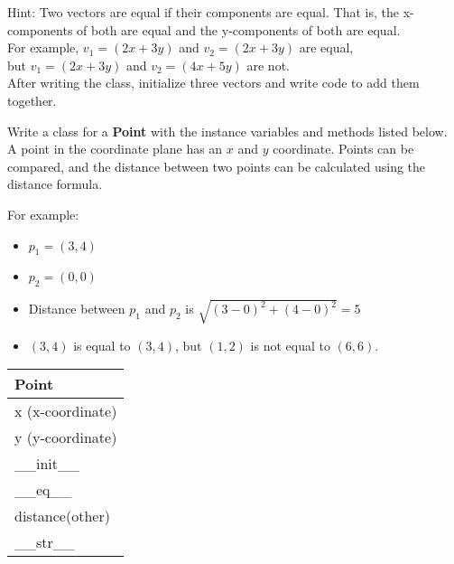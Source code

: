 		Hint: Two vectors are equal if their components are equal. That is, the x-components 
		of both are equal and the y-components of both are equal.\\
		For example, $v_1 =(2x + 3y)$ and $v_2=(2x + 3y)$ are equal, \\
		but $v_1=(2x + 3y)$ and $v_2=(4x + 5y)$ are not.\\[0.5em]
		After writing the class, initialize three vectors and write code to add them together.





	\item
		Write a class for a \textbf{Point} with the instance variables and methods listed below.\\
		A point in the coordinate plane has an $x$ and $y$ coordinate. Points can be compared, 
		and the distance between two points can be calculated using the distance formula.
			
		\begin{minipage}[t]{0.65\textwidth}
			For example:
			\begin{itemize}
				\item $p_1 = (3, 4)$
				\item $p_2 = (0, 0)$
				\item Distance between $p_1$ and $p_2$ is $\sqrt{(3 - 0)^2 + (4 - 0)^2} = 5$
				\item $(3,4)$ is equal to $(3,4)$, but $(1,2)$ is not equal to $(6,6)$.
			\end{itemize}
		\end{minipage}
		\hfill
		\begin{minipage}[t]{0.32\textwidth}
			\vspace{.2em}
			\begin{flushright}
				\begin{tabular}{|l|}
					\hline
					Point \\ \hline
					x (x-coordinate) \\
					y (y-coordinate) \\ \hline
					\_\_init\_\_ \\
					\_\_eq\_\_ \\
					distance(other) \\
					\_\_str\_\_ \\ \hline
				\end{tabular}
			\end{flushright}
		\end{minipage}
		

